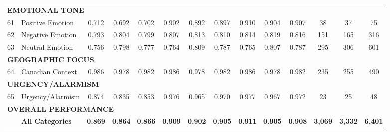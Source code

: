 \documentclass[12pt]{article}
\begin{document}
{\begin{longtable}{p{0.4cm}p{5.5cm}cccccccccccc}
\midrule
\multicolumn{14}{l}{\cellcolor{gray!10}\textbf{EMOTIONAL TONE}} \\
61 & Positive Emotion & 0.712 & 0.692 & 0.702 & 0.902 & 0.892 & 0.897 & 0.910 & 0.904 & 0.907 & 38 & 37 & 75 \\
62 & Negative Emotion & 0.793 & 0.804 & 0.799 & 0.807 & 0.813 & 0.810 & 0.814 & 0.819 & 0.816 & 151 & 165 & 316 \\
63 & Neutral Emotion & 0.756 & 0.798 & 0.777 & 0.764 & 0.809 & 0.787 & 0.765 & 0.807 & 0.787 & 295 & 306 & 601 \\
\midrule
\multicolumn{14}{l}{\cellcolor{gray!10}\textbf{GEOGRAPHIC FOCUS}} \\
64 & Canadian Context & 0.986 & 0.978 & 0.982 & 0.986 & 0.978 & 0.982 & 0.986 & 0.978 & 0.982 & 235 & 255 & 490 \\
\midrule
\multicolumn{14}{l}{\cellcolor{gray!10}\textbf{URGENCY/ALARMISM}} \\
65 & Urgency/Alarmism & 0.874 & 0.835 & 0.853 & 0.976 & 0.965 & 0.970 & 0.977 & 0.967 & 0.972 & 23 & 25 & 48 \\
\midrule
\multicolumn{14}{l}{\cellcolor{gray!20}\textbf{OVERALL PERFORMANCE}} \\
& \textbf{All Categories} & \textbf{0.869} & \textbf{0.864} & \textbf{0.866} & \textbf{0.909} & \textbf{0.902} & \textbf{0.905} & \textbf{0.911} & \textbf{0.905} & \textbf{0.908} & \textbf{3,069} & \textbf{3,332} & \textbf{6,401} \\
\bottomrule
\end{longtable}
} %
\end{document}
